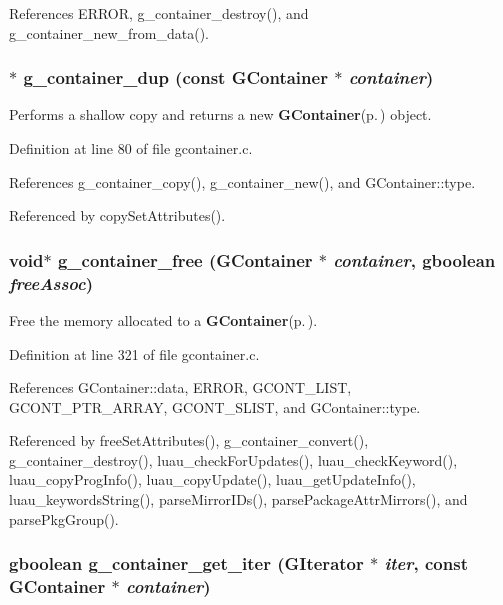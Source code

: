 References ERROR, g\_\-container\_\-destroy(), and g\_\-container\_\-new\_\-from\_\-data().
\subsubsection{$\ast$ g\_\-container\_\-dup (const {\bf GContainer} $\ast$ {\em container})}\label{gcontainer_8c_a4}


Performs a shallow copy and returns a new {\bf GContainer}{\rm (p.\,\pageref{structGContainer})} object. 



Definition at line 80 of file gcontainer.c.

References g\_\-container\_\-copy(), g\_\-container\_\-new(), and GContainer::type.

Referenced by copy\-Set\-Attributes().
\subsubsection{\setlength{\rightskip}{0pt plus 5cm}void$\ast$ g\_\-container\_\-free ({\bf GContainer} $\ast$ {\em container}, gboolean {\em free\-Assoc})}\label{gcontainer_8c_a19}


Free the memory allocated to a {\bf GContainer}{\rm (p.\,\pageref{structGContainer})}. 



Definition at line 321 of file gcontainer.c.

References GContainer::data, ERROR, GCONT\_\-LIST, GCONT\_\-PTR\_\-ARRAY, GCONT\_\-SLIST, and GContainer::type.

Referenced by free\-Set\-Attributes(), g\_\-container\_\-convert(), g\_\-container\_\-destroy(), luau\_\-check\-For\-Updates(), luau\_\-check\-Keyword(), luau\_\-copy\-Prog\-Info(), luau\_\-copy\-Update(), luau\_\-get\-Update\-Info(), luau\_\-keywords\-String(), parse\-Mirror\-IDs(), parse\-Package\-Attr\-Mirrors(), and parse\-Pkg\-Group().
\subsubsection{\setlength{\rightskip}{0pt plus 5cm}gboolean g\_\-container\_\-get\_\-iter ({\bf GIterator} $\ast$ {\em iter}, const {\bf GContainer} $\ast$ {\em container})}\label{gcontainer_8c_a12}




